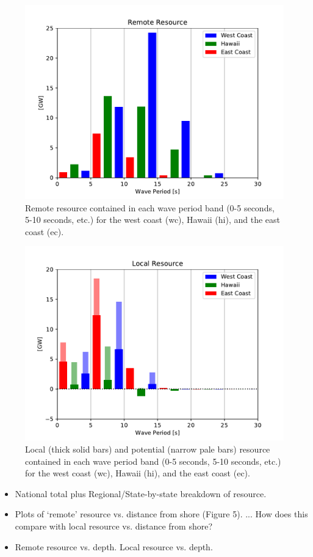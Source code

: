 \begin{figure}[ht]
  \centering
  \includegraphics[width=\linewidth]{../fig/RemoteResource_Freq01.pdf}
  \caption{Remote resource contained in each wave period band (0-5 seconds, 5-10 seconds, etc.) for the west coast (wc), Hawaii (hi), and the east coast (ec).}
  \label{fig:remote-freq}
\end{figure}

\begin{figure}[ht]
  \centering
  \includegraphics[width=\linewidth]{../fig/LocalResource_Freq01.pdf}
  \caption{Local (thick solid bars) and potential (narrow pale bars) resource contained in each wave period band (0-5 seconds, 5-10 seconds, etc.) for the west coast (wc), Hawaii (hi), and the east coast (ec).}
  \label{fig:remote-freq}
\end{figure}

\begin{itemize}
\item National total plus Regional/State-by-state breakdown of resource.
\item Plots of ‘remote’ resource vs. distance from shore (Figure 5). ... How does this compare with local resource vs. distance from shore?
\item Remote resource vs. depth. Local resource vs. depth.
\end{itemize}


